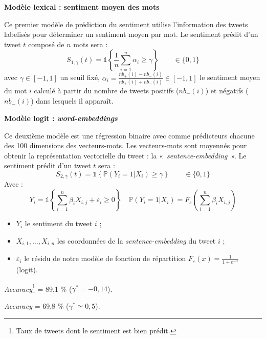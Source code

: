 \documentclass[10pt,french,french]{article}
\let\rmarkdownfootnote\footnote%
\def\footnote{\protect\rmarkdownfootnote}
\begin{document}
\begin{multicols}{2}

\textbf{Modèle lexical : sentiment moyen des mots }

Ce premier modèle de prédiction du sentiment utilise l'information des tweets labelisés pour déterminer un sentiment moyen par mot.
Le sentiment prédit d'un tweet $t$ composé de $n$ mots sera :
$$S_{1,\gamma}(t) = \mathds{1}\left\{ \frac{1}{n} \sum \limits_{i=1}^n \alpha_i \geq \gamma\right\} \qquad \in \{ 0,1\}$$
  avec $\gamma \in [-1,1]$ un seuil fixé, $\alpha_i = \frac{nb_+(i) - nb_-(i)}{nb_+(i) + nb_-(i)} \in [-1,1]$  le sentiment moyen du mot $i$ calculé à partir du nombre de tweets positifs ($nb_+(i)$) et négatifs ($nb_-(i)$) dans lesquels il apparaît.

\vspace{2.5cm}

\textbf{Modèle logit : \emph{word-embeddings}}

Ce deuxième modèle est une régression binaire avec comme prédicteurs chacune des 100 dimensions des vecteurs-mots. Les vecteurs-mots sont moyennés pour obtenir la représentation vectorielle du tweet : la  « \emph{sentence-embedding} ».
Le sentiment prédit d'un tweet $t$ sera :
 $$S_{2,\gamma}(t) =\mathds{1}\left\{   \mathbb{P}(Y_i = 1 | X_{i}) \ge \gamma\right\} \qquad \in \{ 0,1 \}$$
Avec : 
\footnotesize{
$$Y_i = \mathds{1}\left\{ \sum_{i = 1}^n \beta_i X_{i,j} + \varepsilon_i \geq 0 \right\} \quad  \mathbb{P}(Y_i = 1 | X_{i}) = F_{\varepsilon}\left(\sum_{i = 1}^n \beta_i X_{i,j}\right)$$
}

\normalsize
\begin{itemize}
\item $Y_i$ le sentiment du tweet $i$ ;
\item $X_{i,1}, \dots, X_{i,n}$ les coordonnées de la \emph{sentence-embedding} du tweet $i$ ;
\item $\varepsilon_i$ le résidu de notre modèle de fonction de répartition $F_{\varepsilon}(x) = \frac{1}{1 + e^{-x}}$ (logit).
\end{itemize}

 \end{multicols}

\begin{multicols}{2}
\faArrowCircleRight{} \emph{Accuracy}\footnote{Taux de tweets dont le sentiment est bien prédit.} =  89,1 \% ($\gamma^* = -0,14$).

\faArrowCircleRight{} \emph{Accuracy} =  69,8 \% ($\gamma^* \simeq 0,5$).

 \end{multicols}
\end{document}

